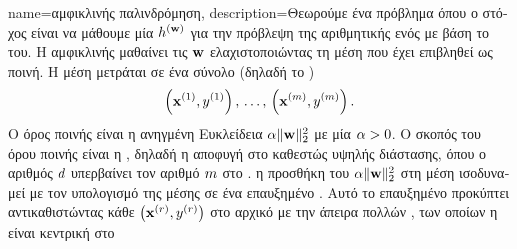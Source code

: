 {name={\foreignlanguage{greek}{αμφικλινής παλινδρόμηση}}, 
	description={\foreignlanguage{greek}{Θεωρούμε ένα πρόβλημα}  \foreignlanguage{greek}{όπου 
		ο στόχος είναι να μάθουμε μία}  $h^{({\bf w})}$ 
		\foreignlanguage{greek}{για την πρόβλεψη της αριθμητικής}  \foreignlanguage{greek}{ενός} 
		 \foreignlanguage{greek}{με βάση το}  \foreignlanguage{greek}{του}. 
	  	\foreignlanguage{greek}{Η αμφικλινής}  \foreignlanguage{greek}{μαθαίνει
		τις}  ${\bf w}$ \foreignlanguage{greek}{ελαχιστοποιώντας τη μέση} 
	  	\foreignlanguage{greek}{που έχει επιβληθεί ως ποινή. Η μέση}  \foreignlanguage{greek}{μετράται
		σε ένα σύνολο}  \foreignlanguage{greek}{(δηλαδή το} ) 
		$$\left( {\bf x}^{(1)},y^{(1)} \right), \,\ldots, \,\left( {\bf x}^{(m)},y^{(m)} \right).$$ 
		\foreignlanguage{greek}{Ο όρος ποινής είναι η ανηγμένη Ευκλείδεια}  $\alpha \| {\bf w} \|^{2}_{2}$ 
		\foreignlanguage{greek}{με μία}   $\alpha > 0$. 
		\foreignlanguage{greek}{Ο σκοπός του όρου ποινής είναι η} , \foreignlanguage{greek}{δηλαδή 
		η αποφυγή}  \foreignlanguage{greek}{στο καθεστώς υψηλής διάστασης, όπου ο αριθμός} 
		 $d$ \foreignlanguage{greek}{υπερβαίνει τον αριθμό}  $m$ 
		\foreignlanguage{greek}{στο} . \foreignlanguage{greek}{η προσθήκη του $\alpha \| {\bf w} \|^{2}_{2}$ 
		στη μέση}  \foreignlanguage{greek}{ισοδυναμεί με τον υπολογισμό της μέσης}  
		 \foreignlanguage{greek}{σε ένα επαυξημένο} . \foreignlanguage{greek}{Αυτό το 
		επαυξημένο}  \foreignlanguage{greek}{προκύπτει αντικαθιστώντας κάθε}  
		$\left( {\bf x}^{(r)},y^{(r)} \right)$ \foreignlanguage{greek}{στο αρχικό}  
		\foreignlanguage{greek}{με την}  \foreignlanguage{greek}{άπειρα πολλών}  
		, \foreignlanguage{greek}{των οποίων η}  \foreignlanguage{greek}{είναι κεντρική στο} 
}}
